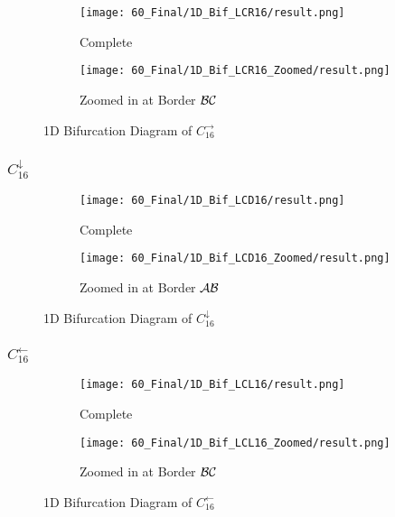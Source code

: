 \begin{figure}
    \centering
    \begin{subfigure}{0.4\textwidth}
        \centering
        \texttt{[image: 60\_Final/1D\_Bif\_LCR16/result.png]}
        \caption{Complete}
        \label{fig:bifurcation.C.right}
    \end{subfigure}
    \begin{subfigure}{0.4\textwidth}
        \centering
        \texttt{[image: 60\_Final/1D\_Bif\_LCR16\_Zoomed/result.png]}
        \caption{Zoomed in at Border $\mathcal{B}\mathcal{C}$}
        \label{fig:final.bifurcation.C.right.zoomed}
    \end{subfigure}
    \caption{1D Bifurcation Diagram of $C_{16}^\rightarrow$}
\end{figure}

\subsubsection{$C_{16}^\downarrow$}

\begin{figure}
    \centering
    \begin{subfigure}{0.4\textwidth}
        \centering
        \texttt{[image: 60\_Final/1D\_Bif\_LCD16/result.png]}
        \caption{Complete}
        \label{fig:bifurcation.C.down}
    \end{subfigure}
    \begin{subfigure}{0.4\textwidth}
        \centering
        \texttt{[image: 60\_Final/1D\_Bif\_LCD16\_Zoomed/result.png]}
        \caption{Zoomed in at Border $\mathcal{A}\mathcal{B}$}
        \label{fig:final.bifurcation.C.down.zoomed}
    \end{subfigure}
    \caption{1D Bifurcation Diagram of $C_{16}^\downarrow$}
\end{figure}

\subsubsection{$C_{16}^\leftarrow$}

\begin{figure}
    \centering
    \begin{subfigure}{0.4\textwidth}
        \centering
        \texttt{[image: 60\_Final/1D\_Bif\_LCL16/result.png]}
        \caption{Complete}
        \label{fig:bifurcation.C.left}
    \end{subfigure}
    \begin{subfigure}{0.4\textwidth}
        \centering
        \texttt{[image: 60\_Final/1D\_Bif\_LCL16\_Zoomed/result.png]}
        \caption{Zoomed in at Border $\mathcal{B}\mathcal{C}$}
        \label{fig:final.bifurcation.C.left.zoomed}
    \end{subfigure}
    \caption{1D Bifurcation Diagram of $C_{16}^\leftarrow$}
\end{figure}

